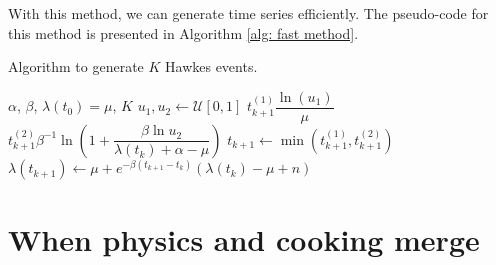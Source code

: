 With this method, we can generate time series efficiently. The pseudo-code for this method is presented in Algorithm \ref{alg: fast method}.
\begin{algorithm}
    \caption{Algorithm to generate $K$ Hawkes events.}\label{alg: fast method}
    \begin{algorithmic}
        \Require $\alpha$, $\beta$, $\lambda(t_0)=\mu$, $K$
            \State $u_1,u_2 \gets \mathcal{U}[0,1]$
            \State $t_{k+1}^{(1)} \dfrac{\ln(u_1)}{\mu}$
            \State $t_{k+1}^{(2)} \beta^{-1}\ln\left( 1+\dfrac{\beta\ln u_2}{\lambda(t_k)+\alpha-\mu} \right)$
            \State $t_{k+1} \gets \min\left( t_{k+1}^{(1)},t_{k+1}^{(2)} \right)$
            \State $\lambda(t_{k+1}) \gets \mu + e^{-\beta(t_{k+1}-t_k)}\left( \lambda(t_k)-\mu+n \right)$
        \EndFor
    \end{algorithmic}
\end{algorithm}


\section{When physics and cooking merge}\label{sec:physics_cooking}